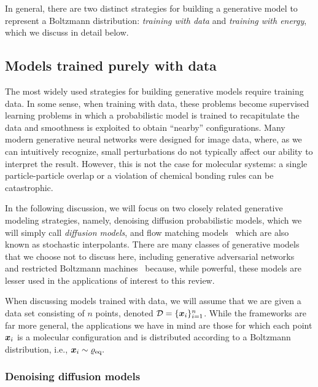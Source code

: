 \documentclass[11pt]{article}
\begin{document}
In general, there are two distinct strategies for building a generative model to represent a Boltzmann distribution: \emph{training with data} and \emph{training with energy}, which we discuss in detail below. 



\subsection{Models trained purely with data}

The most widely used strategies for building generative models require training data.
In some sense, when training with data, these problems become supervised learning problems in which a probabilistic model is trained to recapitulate the data and smoothness is exploited to obtain ``nearby'' configurations.
Many modern generative neural networks were designed for image data, where, as we can intuitively recognize, small perturbations do not typically affect our ability to interpret the result. 
However, this is not the case for molecular systems: a single particle-particle overlap or a violation of chemical bonding rules can be catastrophic. 

In the following discussion, we will focus on two closely related generative modeling strategies, namely, denoising diffusion probabilistic models, which we will simply call \emph{diffusion models}, and flow matching models~\cite{lipman_flow_2022, albergo_building_2022, albergo_stochastic_2023} which are also known as stochastic interpolants.  
There are many classes of generative models that we choose not to discuss here, including generative adversarial networks~\cite{goodfellow_generative_2014} and restricted Boltzmann machines~\cite{salakhutdinov_restricted_2007, salakhutdinov_deep_2009} because, while powerful, these models are lesser used in the applications of interest to this review. 

When discussing models trained with data, we will assume that we are given a data set consisting of $n$ points, denoted $\mathcal{D} = \{ \boldsymbol{x}_i \}_{i=1}^n$.
While the frameworks are far more general, the applications we have in mind are those for which each point $\boldsymbol{x}_i$ is a molecular configuration and is distributed according to a Boltzmann distribution, i.e., $\boldsymbol{x}_i \sim \varrho_{\rm eq}.$

\subsubsection{Denoising diffusion models}\label{sec:diffusion}
\end{document}
